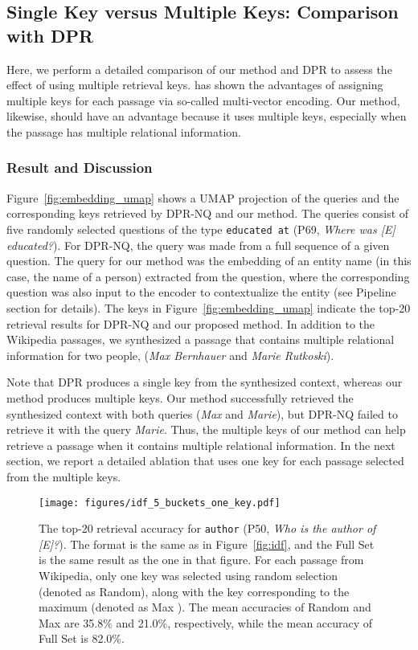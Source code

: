 \documentclass[letterpaper]{article} \usepackage{aaai23}  \usepackage{times}  \usepackage{helvet}  \usepackage{courier}  \usepackage[hyphens]{url}  \usepackage{graphicx} \urlstyle{rm} \def\UrlFont{\rm}  \usepackage{natbib}  \usepackage{caption} \frenchspacing  \setlength{\pdfpagewidth}{8.5in}  \setlength{\pdfpageheight}{11in}  \usepackage{algorithm}
\begin{document}
\subsection{Single Key versus Multiple Keys: Comparison with DPR}\label{sec:comparison_with_dpr}
Here, we perform a detailed comparison of our method and DPR to assess the effect of using multiple retrieval keys.
\citet{luan-etal-2021-sparse} has shown the advantages of assigning multiple keys for each passage via so-called multi-vector encoding.
Our method, likewise, should have an advantage because it uses multiple keys, especially when the passage has multiple relational information.

\subsubsection{Result and Discussion}
Figure~\ref{fig:embedding_umap} shows a UMAP projection \citep{umap} of the queries and the corresponding keys retrieved by DPR-NQ and our method.
The queries consist of five randomly selected questions of the type \texttt{\small educated at} (P69, \textit{Where was [E] educated?}).
For DPR-NQ, the query was made from a full sequence of a given question.
The query for our method was the embedding of an entity name (in this case, the name of a person) extracted from the question, where the corresponding question was also input to the encoder to contextualize the entity (see Pipeline section for details).
The keys in Figure~\ref{fig:embedding_umap} indicate the top-20 retrieval results for DPR-NQ and our proposed method.
In addition to the Wikipedia passages, we synthesized a passage that contains multiple relational information for two people, (\textit{Max Bernhauer} and \textit{Marie Rutkoski}).

Note that DPR produces a single key from the synthesized context, whereas our method produces multiple keys.
Our method successfully retrieved the synthesized context with both queries (\textit{Max} and \textit{Marie}), but DPR-NQ failed to retrieve it with the query \textit{Marie}.
Thus, the multiple keys of our method can help retrieve a passage when it contains multiple relational information.
In the next section, we report a detailed ablation that uses one key for each passage selected from the multiple keys.


\begin{figure}
	\centering
	\texttt{[image: figures/idf\_5\_buckets\_one\_key.pdf]}
	\caption{
		The top-20 retrieval accuracy for \texttt{\small author} (P50, \textit{Who is the author of [E]?}).
		The format is the same as in Figure~\ref{fig:idf},
		and the Full Set is the same result as the one in that figure.
		For each passage from Wikipedia, only one key was selected using random selection (denoted as Random), along with the key corresponding to the maximum  (denoted as Max ).
		The mean accuracies of Random and Max  are 35.8\% and 21.0\%, respectively, while the mean accuracy of Full Set is 82.0\%.
	}
	\label{fig:one_key}
\end{figure}
\end{document}
